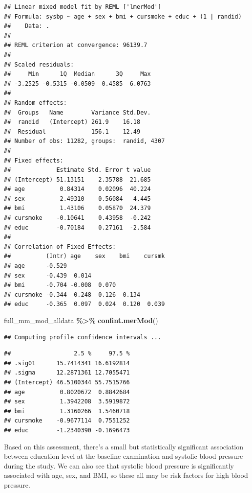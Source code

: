 \documentclass[
]{book}
\newenvironment{Shaded}{\begin{snugshade}}{\end{snugshade}}
\newcommand{\FunctionTok}[1]{\textcolor[rgb]{0.13,0.29,0.53}{\textbf{#1}}}
\newcommand{\NormalTok}[1]{#1}
\newcommand{\SpecialCharTok}[1]{\textcolor[rgb]{0.81,0.36,0.00}{\textbf{#1}}}
\begin{document}
\begin{verbatim}
## Linear mixed model fit by REML ['lmerMod']
## Formula: sysbp ~ age + sex + bmi + cursmoke + educ + (1 | randid)
##    Data: .
## 
## REML criterion at convergence: 96139.7
## 
## Scaled residuals: 
##     Min      1Q  Median      3Q     Max 
## -3.2525 -0.5315 -0.0509  0.4585  6.0763 
## 
## Random effects:
##  Groups   Name        Variance Std.Dev.
##  randid   (Intercept) 261.9    16.18   
##  Residual             156.1    12.49   
## Number of obs: 11282, groups:  randid, 4307
## 
## Fixed effects:
##             Estimate Std. Error t value
## (Intercept) 51.13151    2.35788  21.685
## age          0.84314    0.02096  40.224
## sex          2.49310    0.56084   4.445
## bmi          1.43106    0.05870  24.379
## cursmoke    -0.10641    0.43958  -0.242
## educ        -0.70184    0.27161  -2.584
## 
## Correlation of Fixed Effects:
##          (Intr) age    sex    bmi    cursmk
## age      -0.529                            
## sex      -0.439  0.014                     
## bmi      -0.704 -0.008  0.070              
## cursmoke -0.344  0.248  0.126  0.134       
## educ     -0.365  0.097  0.024  0.120  0.039
\end{verbatim}

\begin{Shaded}
\begin{Highlighting}[]
\NormalTok{full\_mm\_mod\_alldata }\SpecialCharTok{\%\textgreater{}\%} 
  \FunctionTok{confint.merMod}\NormalTok{()}
\end{Highlighting}
\end{Shaded}

\begin{verbatim}
## Computing profile confidence intervals ...
\end{verbatim}

\begin{verbatim}
##                  2.5 %     97.5 %
## .sig01      15.7414341 16.6192814
## .sigma      12.2871361 12.7055471
## (Intercept) 46.5100344 55.7515766
## age          0.8020672  0.8842684
## sex          1.3942208  3.5919872
## bmi          1.3160266  1.5460718
## cursmoke    -0.9677114  0.7551252
## educ        -1.2340390 -0.1696473
\end{verbatim}

Based on this assessment, there's a small but statistically significant
association between education level at the baseline examination and
systolic blood pressure during the study. We can also see that systolic
blood pressure is significantly associated with age, sex, and BMI, so
these all may be risk factors for high blood pressure.
\end{document}
